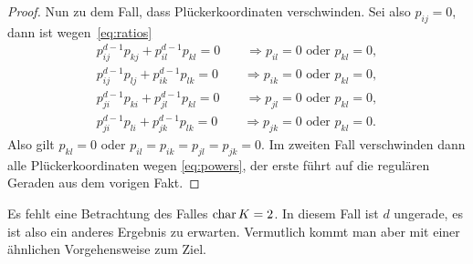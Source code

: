 \begin{proof}
Nun zu dem Fall, dass Plückerkoordinaten verschwinden. Sei also $p_{ij}=0$, dann ist wegen~\eqref{eq:ratios}
\begin{align*}
p_{ij}^{d-1}p_{kj} + p_{il}^{d-1}p_{kl} = 0 \qquad\Rightarrow p_{il} = 0 \text{ oder } p_{kl} = 0, \\
p_{ij}^{d-1}p_{lj} + p_{ik}^{d-1}p_{lk} = 0 \qquad\Rightarrow p_{ik} = 0 \text{ oder } p_{kl} = 0, \\
p_{ji}^{d-1}p_{ki} + p_{jl}^{d-1}p_{kl} = 0 \qquad\Rightarrow p_{jl} = 0 \text{ oder } p_{kl} = 0, \\
p_{ji}^{d-1}p_{li} + p_{jk}^{d-1}p_{lk} = 0 \qquad\Rightarrow p_{jk} = 0 \text{ oder } p_{kl} = 0.
\end{align*}
Also gilt $p_{kl} = 0$ oder $p_{il} = p_{ik} = p_{jl} = p_{jk} = 0$. Im zweiten Fall verschwinden dann alle Plückerkoordinaten wegen \eqref{eq:powers}, der erste führt auf die regulären Geraden aus dem vorigen Fakt.
\end{proof}
\begin{remarks}
Es fehlt eine Betrachtung des Falles $\operatorname{char} K = 2$. In diesem Fall ist $d$ ungerade, es ist also ein anderes Ergebnis zu erwarten. Vermutlich kommt man aber mit einer ähnlichen Vorgehensweise zum Ziel.
\end{remarks}

